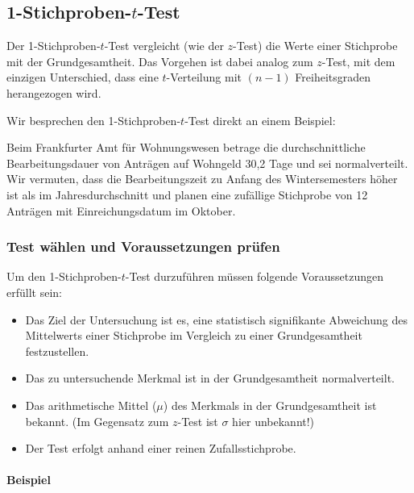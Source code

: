 \documentclass[
  ngerman,
]{article}
\providecommand{\tightlist}{%
  \setlength{\itemsep}{0pt}\setlength{\parskip}{0pt}}
\begin{document}
\hypertarget{stichproben-t-test}{%
\subsection{\texorpdfstring{1-Stichproben-\(t\)-Test}{1-Stichproben-t-Test}}\label{stichproben-t-test}}

Der 1-Stichproben-\(t\)-Test vergleicht (wie der \(z\)-Test) die Werte einer Stichprobe mit der Grundgesamtheit. Das Vorgehen ist dabei analog zum \(z\)-Test, mit dem einzigen Unterschied, dass eine \(t\)-Verteilung mit \((n-1)\) Freiheitsgraden herangezogen wird.

Wir besprechen den 1-Stichproben-\(t\)-Test direkt an einem Beispiel:

Beim Frankfurter Amt für Wohnungswesen betrage die durchschnittliche Bearbeitungsdauer von Anträgen auf Wohngeld 30,2 Tage und sei normalverteilt. Wir vermuten, dass die Bearbeitungszeit zu Anfang des Wintersemesters höher ist als im Jahresdurchschnitt und planen eine zufällige Stichprobe von 12 Anträgen mit Einreichungsdatum im Oktober.

\hypertarget{test-wuxe4hlen-und-voraussetzungen-pruxfcfen-1}{%
\subsubsection{Test wählen und Voraussetzungen prüfen}\label{test-wuxe4hlen-und-voraussetzungen-pruxfcfen-1}}

Um den 1-Stichproben-\(t\)-Test durzuführen müssen folgende Voraussetzungen erfüllt sein:

\begin{itemize}
\tightlist
\item
  Das Ziel der Untersuchung ist es, eine statistisch signifikante Abweichung des Mittelwerts einer Stichprobe im Vergleich zu einer Grundgesamtheit festzustellen.
\item
  Das zu untersuchende Merkmal ist in der Grundgesamtheit normalverteilt.
\item
  Das arithmetische Mittel (\(\mu\)) des Merkmals in der Grundgesamtheit ist bekannt. (Im Gegensatz zum \(z\)-Test ist \(\sigma\) hier unbekannt!)
\item
  Der Test erfolgt anhand einer reinen Zufallsstichprobe.
\end{itemize}

\hypertarget{beispiel-6}{%
\paragraph{Beispiel}\label{beispiel-6}}
\end{document}
